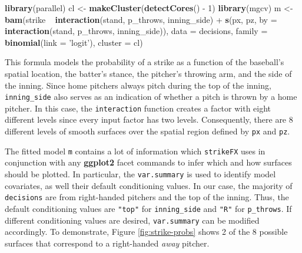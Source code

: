 \documentclass[12pt,]{isuthesis}
\newenvironment{Shaded}{\begin{snugshade}}{\end{snugshade}}
\newcommand{\KeywordTok}[1]{\textcolor[rgb]{0.13,0.29,0.53}{\textbf{{#1}}}}
\newcommand{\DataTypeTok}[1]{\textcolor[rgb]{0.13,0.29,0.53}{{#1}}}
\newcommand{\DecValTok}[1]{\textcolor[rgb]{0.00,0.00,0.81}{{#1}}}
\newcommand{\StringTok}[1]{\textcolor[rgb]{0.31,0.60,0.02}{{#1}}}
\newcommand{\NormalTok}[1]{{#1}}
\begin{document}
\begin{Shaded}
\begin{Highlighting}[]
\KeywordTok{library}\NormalTok{(parallel) }
\NormalTok{cl <-}\StringTok{ }\KeywordTok{makeCluster}\NormalTok{(}\KeywordTok{detectCores}\NormalTok{() -}\StringTok{ }\DecValTok{1}\NormalTok{)}
\KeywordTok{library}\NormalTok{(mgcv) }
\NormalTok{m <-}\StringTok{ }\KeywordTok{bam}\NormalTok{(strike ~}\StringTok{ }\KeywordTok{interaction}\NormalTok{(stand, p_throws, inning_side) +}\StringTok{                }
\StringTok{  }\KeywordTok{s}\NormalTok{(px, pz, }\DataTypeTok{by =} \KeywordTok{interaction}\NormalTok{(stand, p_throws, inning_side)),              }
  \DataTypeTok{data =} \NormalTok{decisions, }\DataTypeTok{family =} \KeywordTok{binomial}\NormalTok{(}\DataTypeTok{link =} \StringTok{'logit'}\NormalTok{), }\DataTypeTok{cluster =} \NormalTok{cl)}
\end{Highlighting}
\end{Shaded}

This formula models the probability of a strike as a function of the
baseball's spatial location, the batter's stance, the pitcher's throwing
arm, and the side of the inning. Since home pitchers always pitch during
the top of the inning, \texttt{inning\_side} also serves as an
indication of whether a pitch is thrown by a home pitcher. In this case,
the \texttt{interaction} function creates a factor with eight different
levels since every input factor has two levels. Consequently, there are
8 different levels of smooth surfaces over the spatial region defined by
\texttt{px} and \texttt{pz}.

The fitted model \texttt{m} contains a lot of information which
\texttt{strikeFX} uses in conjunction with any \textbf{ggplot2} facet
commands to infer which and how surfaces should be plotted. In
particular, the \texttt{var.summary} is used to identify model
covariates, as well their default conditioning values. In our case, the
majority of \texttt{decisions} are from right-handed pitchers and the
top of the inning. Thus, the default conditioning values are
\texttt{"top"} for \texttt{inning\_side} and \texttt{"R"} for
\texttt{p\_throws}. If different conditioning values are desired,
\texttt{var.summary} can be modified accordingly. To demonstrate, Figure
\ref{fig:strike-probs} shows 2 of the 8 possible surfaces that
correspond to a right-handed \emph{away} pitcher.

\begin{Shaded}
\end{Shaded}
\end{document}
